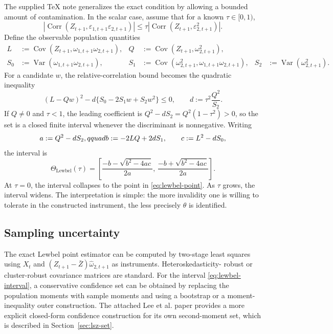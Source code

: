 \documentclass[11pt]{article}
\newcommand{\Cov}{\operatorname{Cov}}
\newcommand{\Var}{\operatorname{Var}}
\newcommand{\Corr}{\operatorname{Corr}}
\theoremstyle{plain}
\theoremstyle{definition}
\theoremstyle{remark}
\begin{document}
The supplied TeX note generalizes the exact condition by allowing a bounded
amount of contamination. In the scalar case, assume that for a known
$\tau\in[0,1)$,
\begin{equation}
\left|\Corr(Z_{t+1},\varepsilon_{1,t+1}\varepsilon_{2,t+1})\right|
\le
\tau\left|\Corr(Z_{t+1},\varepsilon_{2,t+1}^2)\right|.
\label{eq:relative-corr}
\end{equation}
Define the observable population quantities
\begin{align}
L&:=\Cov(Z_{t+1},\omega_{1,t+1}\omega_{2,t+1}),&
Q&:=\Cov(Z_{t+1},\omega_{2,t+1}^2),\label{eq:LQ}\\
S_0&:=\Var(\omega_{1,t+1}\omega_{2,t+1}),&
S_1&:=\Cov(\omega_{2,t+1}^2,\omega_{1,t+1}\omega_{2,t+1}),&
S_2&:=\Var(\omega_{2,t+1}^2).
\label{eq:S012}
\end{align}
For a candidate $w$, the relative-correlation bound becomes the quadratic
inequality
\begin{equation}
(L-Qw)^2-d\{S_0-2S_1w+S_2w^2\}\le0,
\qquad d:=\tau^2\frac{Q^2}{S_2}.
\label{eq:scalar-lewbel-set}
\end{equation}
If $Q\ne0$ and $\tau<1$, the leading coefficient is
$Q^2-dS_2=Q^2(1-\tau^2)>0$, so the set is a closed finite interval whenever the
discriminant is nonnegative. Writing
\begin{equation}
a:=Q^2-dS_2,\\qquad
b:=-2LQ+2dS_1,
\qquad
c:=L^2-dS_0,
\label{eq:abc-lewbel}
\end{equation}
the interval is
\begin{equation}
\Theta_{\text{Lewbel}}(\tau)=
\left[
\frac{-b-\sqrt{b^2-4ac}}{2a},\,
\frac{-b+\sqrt{b^2-4ac}}{2a}
\right].
\label{eq:lewbel-interval}
\end{equation}
At $\tau=0$, the interval collapses to the point in \eqref{eq:lewbel-point}. As
$\tau$ grows, the interval widens. The interpretation is simple: the more
invalidity one is willing to tolerate in the constructed instrument, the less
precisely $\theta$ is identified.

\subsection{Sampling uncertainty}

The exact Lewbel point estimator can be computed by two-stage least squares using
$X_t$ and $(Z_{t+1}-\bar Z)\widehat \omega_{2,t+1}$ as instruments. Heteroskedasticity-
robust or cluster-robust covariance matrices are standard. For the interval
\eqref{eq:lewbel-interval}, a conservative confidence set can be obtained by
replacing the population moments with sample moments and using a bootstrap or a
moment-inequality outer construction. The attached Lee et al. paper provides a
more explicit closed-form confidence construction for its own second-moment set,
which is described in Section~\ref{sec:lsz-set}.
\end{document}
